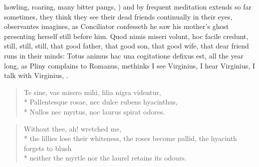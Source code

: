 {howling, roaring, many bitter pangs, ) and by frequent meditation extends so
far sometimes, they think they see their dead friends continually
in their eyes, observantes imagines, as Conciliator confesseth he saw
his mother's ghost presenting herself still before him. Quod nimis
miseri volunt, hoc facile credunt, still, still, still, that good
father, that good son, that good wife, that dear friend runs in their
minds: Totus animus hac una cogitatione defixus est, all the year long,
as Pliny complains to Romanus, methinks I see Virginius, I hear
Virginius, I talk with Virginius, \etc{}.
%
\begin{latin}
\begin{verse}
Te sine, vae misero mihi, lilia nigra videntur,\\*
Pallentesque rosae, nec dulce rubens hyacinthus,\\*
Nullos nec myrtus, noc laurus spirat odores.
\end{verse}
\end{latin}
\translationrule
\begin{verse}%
Without thee, ah! wretched me,\\*
the lillies lose their whiteness, the roses become pallid, the hyacinth forgets to blush\\*
neither the myrtle nor the laurel retains its odours.
\end{verse}

}
